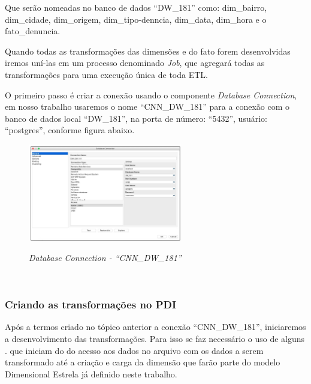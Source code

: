 Que ser\~{a}o nomeadas no banco de dados ``DW\_181'' como: dim\_bairro, dim\_cidade, dim\_origem, dim\_tipo-denncia, dim\_data, dim\_hora e o fato\_denuncia.

Quando todas as transforma\c{c}\~{o}es das dimens\~{o}es e do fato forem desenvolvidas iremos un\'{i}-las em um processo denominado \textit{Job}, que agregar\'{a} todas as transforma\c{c}\~{o}es para uma execu\c{c}\~{a}o única de toda ETL.

O primeiro passo \'{e} criar a conex\~{a}o usando o componente \textit{Database Connection}, em nosso trabalho usaremos o nome ``CNN\_DW\_181'' para a conex\~{a}o com o banco de dados local ``DW\_181'', na porta de número: ``5432'', usu\'{a}rio: ``postgres'', conforme figura abaixo.

\begin{figure}[H]
	\vspace*{0,2cm}
    \centering
    \caption{\textit{Database Connection - ``CNN\_DW\_181''}}
    \includegraphics[width=0.6\textwidth]{./04-figuras/figura-pentaho-database-connection}
    \label{fig:ilustfigpentaho-database-connection}
\end{figure}
\vspace*{-0,9cm}
{\raggedright {}} \\

\subsubsection{Criando as transforma\c{c}\~{o}es no PDI}

Ap\'os a termos criado no t\'opico anterior a conex\~{a}o ``CNN\_DW\_181'', iniciaremos a desenvolvimento das transforma\c{c}\~{o}es. Para isso se faz necess\'{a}rio o uso de alguns . que iniciam do do acesso aos dados no arquivo com os dados a serem transformado at\'{e} a cria\c{c}\~{a}o e carga da dimens\~{a}o que far\~{a}o parte do modelo Dimensional Estrela j\'{a} definido neste trabalho.

